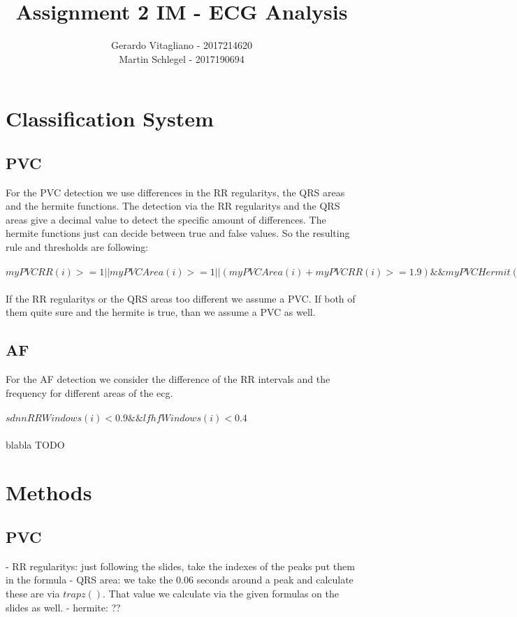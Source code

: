\documentclass[a4paper,titlepage]{article}
\begin{document}
\title{Assignment 2 IM - ECG Analysis}
\author{Gerardo Vitagliano - 2017214620 \\ Martin Schlegel - 2017190694 }
\date{\vspace{-5ex}}
\vfill
\maketitle
\clearpage
\section{Classification System}

\subsection{PVC}
For the PVC detection we use differences in the RR regularitys, the QRS areas and the hermite functions.
The detection via the RR regularitys and the QRS areas give a decimal value to detect the specific amount of differences. The hermite functions just can decide between true and false values. So the resulting rule and thresholds are following:\\\\
$myPVCRR(i) >= 1 || myPVCArea(i) >= 1 || (myPVCArea(i) + myPVCRR(i) >= 1.9) \&\& myPVCHermit(i) == 1$
\\\\
If the RR regularitys or the QRS areas too different we assume a PVC. If both of them quite sure and the hermite is true, than we assume a PVC as well.

\subsection{AF}
For the AF detection we consider the difference of the RR intervals and the frequency for different areas of the ecg.\\\\
$sdnnRRWindows(i) < 0.9 \&\& lfhfWindows(i) < 0.4$
\\\\
blabla TODO

\section{Methods}

\subsection{PVC}
- RR regularitys: just following the slides, take the indexes of the peaks put them in the formula
- QRS area: we take the 0.06 seconds around a peak and calculate these are via $trapz()$. That value we calculate via the given formulas on the slides as well.
- hermite: ??
\end{document}
